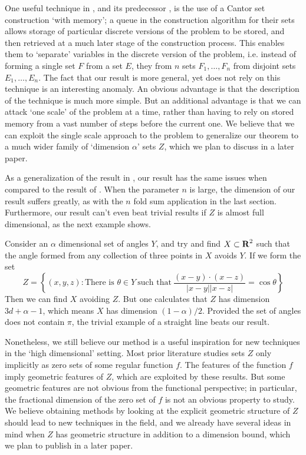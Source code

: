 One useful technique in \cite{MalabikaRob}, and its predecessor \cite{KeletiDimOneSet}, is the use of a Cantor set construction `with memory'; a queue in the construction algorithm for their sets allows storage of particular discrete versions of the problem to be stored, and then retrieved at a much later stage of the construction process. This enables them to `separate' variables in the discrete version of the problem, i.e. instead of forming a single set $F$ from a set $E$, they from $n$ sets $F_1, \dots, F_n$ from disjoint sets $E_1, \dots, E_n$. The fact that our result is more general, yet does not rely on this technique is an interesting anomaly. An obvious advantage is that the description of the technique is much more simple. But an additional advantage is that we can attack `one scale' of the problem at a time, rather than having to rely on stored memory from a vast number of steps before the current one. We believe that we can exploit the single scale approach to the problem to generalize our theorem to a much wider family of `dimension $\alpha$' sets $Z$, which we plan to discuss in a later paper.

As a generalization of the result in \cite{MalabikaRob}, our result has the same issues when compared to the result of \cite{Mathe}. When the parameter $n$ is large, the dimension of our result suffers greatly, as with the $n$ fold sum application in the last section. Furthermore, our result can't even beat trivial results if $Z$ is almost full dimensional, as the next example shows.

\begin{example}
	Consider an $\alpha$ dimensional set of angles $Y$, and try and find $X \subset \operatorname{\mathbf{R}}^2$ such that the angle formed from any collection of three points in $X$ avoids $Y$. If we form the set
	\[ Z = \left\{ (x,y,z): \text{There is $\theta \in Y$}\ \text{such that}\ \frac{(x - y) \cdot (x - z)}{|x - y||x - z|} = \cos \theta \right\} \]
	Then we can find $X$ avoiding $Z$. But one calculates that $Z$ has dimension $3d + \alpha - 1$, which means $X$ has dimension $(1 - \alpha) / 2$. Provided the set of angles does not contain $\pi$, the trivial example of a straight line beats our result.
\end{example}

Nonetheless, we still believe our method is a useful inspiration for new techniques in the `high dimensional' setting. Most prior literature studies sets $Z$ only implicitly as zero sets of some regular function $f$. The features of the function $f$ imply geometric features of $Z$, which are exploited by these results. But some geometric features are not obvious from the functional perspective; in particular, the fractional dimension of the zero set of $f$ is not an obvious property to study. We believe obtaining methods by looking at the explicit geometric structure of $Z$ should lead to new techniques in the field, and we already have several ideas in mind when $Z$ has geometric structure in addition to a dimension bound, which we plan to publish in a later paper.

